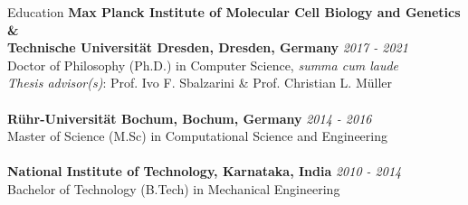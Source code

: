 \documentclass{resume} %
\begin{document}
\begin{rSection}{\small{Education}}
{\small \bf Max Planck Institute of Molecular Cell Biology and Genetics \& } \\
{\small \bf Technische Universit{\"a}t Dresden, Dresden, Germany}
\hfill {\small \textit{2017 - 2021} }
\\ \small Doctor of Philosophy (Ph.D.) in Computer Science, \textit{summa cum laude}
\\ \small \textit{Thesis advisor(s)}: Prof. Ivo F. Sbalzarini \& Prof. Christian L. M{\"u}ller  %
\\ \\
{\small \bf R{\"u}hr-Universit{\"a}t Bochum, Bochum, Germany} \hfill {\textit{2014 - 2016} }
\\ \small Master of Science (M.Sc) in Computational Science and Engineering
\\ \\
{\small \bf National Institute of Technology, Karnataka, India} \hfill {\textit{2010 - 2014} }
\\ \small Bachelor of Technology (B.Tech) in Mechanical Engineering

\end{rSection}

\end{document}
